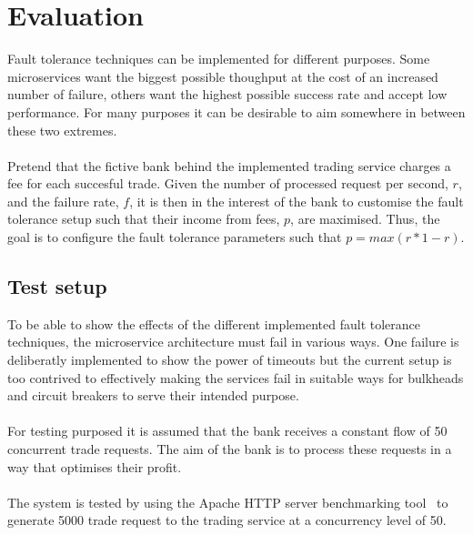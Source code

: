 \section{Evaluation}
Fault tolerance techniques can be implemented for different
purposes. Some microservices want the biggest possible thoughput at
the cost of an increased number of failure, others want the highest
possible success rate and accept low performance. For many purposes it
can be desirable to aim somewhere in between these two extremes.
\\\\
Pretend that the fictive bank behind the implemented trading service
charges a fee for each succesful trade. Given the number of processed
request per second, $r$, and the failure rate, $f$, it is then in the
interest of the bank to customise the fault tolerance setup such that
their income from fees, $p$, are maximised. Thus, the goal is to
configure the fault tolerance parameters such that $p = max(r *
1-r)$.

\subsection{Test setup}
To be able to show the effects of the different implemented fault
tolerance techniques, the microservice architecture must fail in
various ways. One failure is deliberatly implemented to show the power
of timeouts but the current setup is too contrived to effectively
making the services fail in suitable ways for bulkheads and circuit
breakers to serve their intended purpose.
\\\\
For testing purposed it is assumed that the bank receives a
constant flow of 50 concurrent trade requests. The aim of the bank is
to process these requests in a way that optimises their profit.
\\\\
The system is tested by using the Apache HTTP server benchmarking
tool~\cite{apache} to generate 5000 trade request to the trading
service at a concurrency level of 50.

